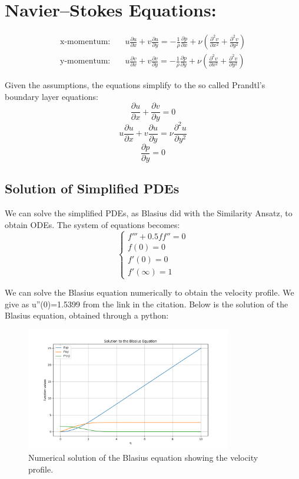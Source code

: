 \documentclass{article}
\begin{document}
\section*{Navier–Stokes Equations:}
\begin{align*}
    \text{x-momentum:} & \quad u \frac{\partial u}{\partial x} + v \frac{\partial u}{\partial y} = -\frac{1}{\rho} \frac{\partial p}{\partial x} + \nu (\frac{\partial^2 v}{\partial x^2}+\frac{\partial^2 v}{\partial y^2}) \\
    \text{y-momentum:} & \quad u \frac{\partial v}{\partial x} + v \frac{\partial v}{\partial y} = -\frac{1}{\rho} \frac{\partial p}{\partial y} + \nu (\frac{\partial^2 v}{\partial x^2}+\frac{\partial^2 v}{\partial y^2})
\end{align*}

Given the assumptions, the equations simplify to the so called Prandtl's boundary layer equations:
\[
\frac{\partial u}{\partial x} + \frac{\partial v}{\partial y} = 0
\]
\[
u \frac{\partial u}{\partial x} + v \frac{\partial u}{\partial y} = \nu \frac{\partial^2 u}{\partial y^2}
\]
\[
\frac{\partial p}{\partial y} = 0
\]

\subsection{Solution of Simplified PDEs}
We can solve the simplified PDEs, as Blasius did with the Similarity Ansatz, to obtain ODEs.
The system of equations becomes:
\[
\begin{cases}
f''' + 0.5 f f'' = 0 \\
f(0) = 0 \\
f'(0) = 0 \\
f'(\infty) = 1
\end{cases}
\]

We can solve the Blasius equation numerically to obtain the velocity profile. We give as u''(0)=1.5399 from the link in the \cite{NumericalMethods} citation.
Below is the solution of the Blasius equation, obtained through a python:
\begin{figure}[h]
    \centering
    \includegraphics[width=0.8\textwidth]{output_plot.png}
    \caption{Numerical solution of the Blasius equation showing the velocity profile.}
    \label{fig:blasius_solution}
\end{figure}
\end{document}
